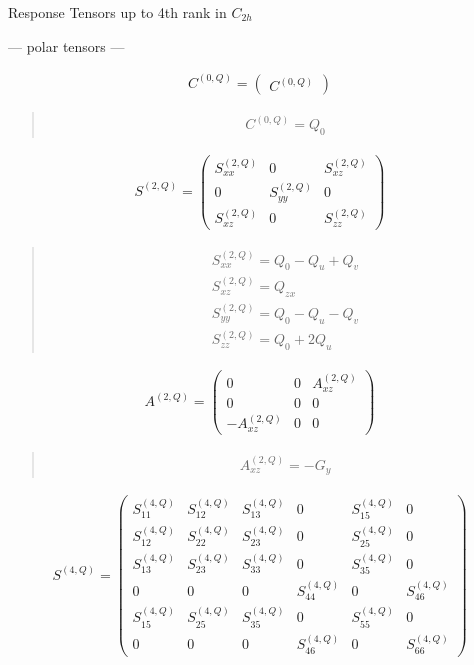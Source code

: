 \documentclass[fleqn,10pt]{jsarticle}
\begin{document}
\setcounter{MaxMatrixCols}{16}

\begin{center}
\LARGE
Response Tensors up to 4th rank in $C_{2h}$
\end{center}
\begin{center}\LARGE --- polar tensors ---\end{center}
\begin{align*}
C^{(0,Q)} = \begin{pmatrix} C^{(0,Q)} \end{pmatrix}
\end{align*}
\begin{quote}
\begin{align*}
& C^{(0,Q)} = Q_{0}
\end{align*}
\end{quote}
\begin{align*}
S^{(2,Q)} = \begin{pmatrix} S^{(2,Q)}_{xx} & 0 & S^{(2,Q)}_{xz} \\ 0 & S^{(2,Q)}_{yy} & 0 \\ S^{(2,Q)}_{xz} & 0 & S^{(2,Q)}_{zz} \end{pmatrix}
\end{align*}
\begin{quote}
\begin{align*}
& S^{(2,Q)}_{xx} = Q_{0} - Q_{u} + Q_{v} \\
& S^{(2,Q)}_{xz} = Q_{zx} \\
& S^{(2,Q)}_{yy} = Q_{0} - Q_{u} - Q_{v} \\
& S^{(2,Q)}_{zz} = Q_{0} + 2 Q_{u}
\end{align*}
\end{quote}
\begin{align*}
A^{(2,Q)} = \begin{pmatrix} 0 & 0 & A^{(2,Q)}_{xz} \\ 0 & 0 & 0 \\ - A^{(2,Q)}_{xz} & 0 & 0 \end{pmatrix}
\end{align*}
\begin{quote}
\begin{align*}
& A^{(2,Q)}_{xz} = - G_{y}
\end{align*}
\end{quote}
\begin{align*}
S^{(4,Q)} = \begin{pmatrix} S^{(4,Q)}_{11} & S^{(4,Q)}_{12} & S^{(4,Q)}_{13} & 0 & S^{(4,Q)}_{15} & 0 \\ S^{(4,Q)}_{12} & S^{(4,Q)}_{22} & S^{(4,Q)}_{23} & 0 & S^{(4,Q)}_{25} & 0 \\ S^{(4,Q)}_{13} & S^{(4,Q)}_{23} & S^{(4,Q)}_{33} & 0 & S^{(4,Q)}_{35} & 0 \\ 0 & 0 & 0 & S^{(4,Q)}_{44} & 0 & S^{(4,Q)}_{46} \\ S^{(4,Q)}_{15} & S^{(4,Q)}_{25} & S^{(4,Q)}_{35} & 0 & S^{(4,Q)}_{55} & 0 \\ 0 & 0 & 0 & S^{(4,Q)}_{46} & 0 & S^{(4,Q)}_{66} \end{pmatrix}
\end{align*}
\end{document}
